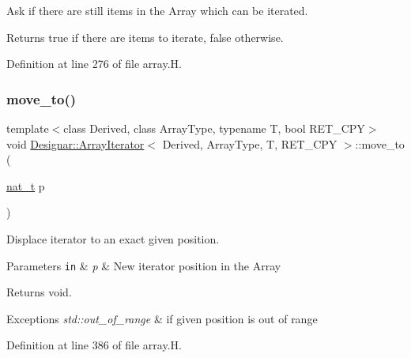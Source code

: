 Ask if there are still items in the Array which can be iterated. 

\begin{DoxyReturn}{Returns}
{\ttfamily true} if there are items to iterate, {\ttfamily false} otherwise. 
\end{DoxyReturn}


Definition at line 276 of file array.\+H.

\mbox{\label{class_designar_1_1_array_iterator_a68f6d13686360c93d95b3a875b14312e}} 
\subsubsection{\texorpdfstring{move\+\_\+to()}{move\_to()}}
{\footnotesize\ttfamily template$<$class Derived, class Array\+Type, typename T, bool R\+E\+T\+\_\+\+C\+PY$>$ \\
void \hyperlink{class_designar_1_1_array_iterator}{Designar\+::\+Array\+Iterator}$<$ Derived, Array\+Type, T, R\+E\+T\+\_\+\+C\+PY $>$\+::move\+\_\+to (\begin{DoxyParamCaption}\item[{\hyperlink{namespace_designar_aa72662848b9f4815e7bf31a7cf3e33d1}{nat\+\_\+t}}]{p }\end{DoxyParamCaption})\hspace{0.3cm}{\ttfamily [inline]}}



Displace iterator to an exact given position. 


\begin{DoxyParams}[1]{Parameters}
\mbox{\tt in}  & {\em p} & New iterator position in the Array \\
\hline
\end{DoxyParams}
\begin{DoxyReturn}{Returns}
void. 
\end{DoxyReturn}

\begin{DoxyExceptions}{Exceptions}
{\em std\+::out\+\_\+of\+\_\+range} & if given position is out of range \\
\hline
\end{DoxyExceptions}


Definition at line 386 of file array.\+H.

